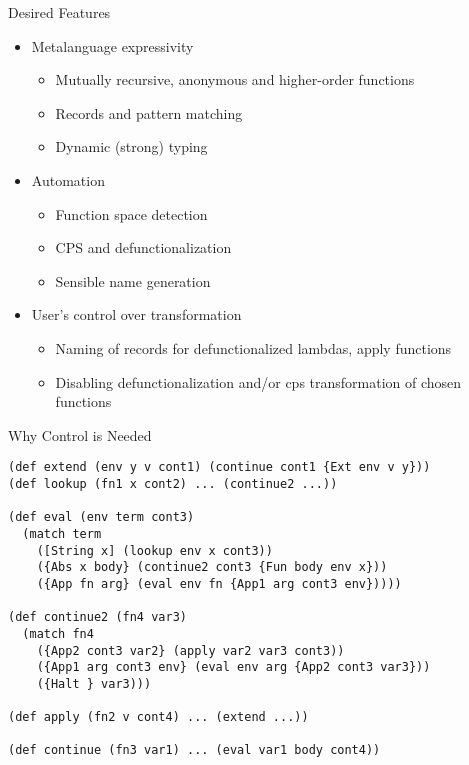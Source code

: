 \documentclass{beamer}
\begin{document}
\begin{frame}{Desired Features}
  \begin{itemize}
    \item Metalanguage expressivity
    \begin{itemize}
      \item Mutually recursive, anonymous and higher-order functions
      \item Records and pattern matching
      \item Dynamic (strong) typing
    \end{itemize}\pause
    \item Automation
    \begin{itemize}
      \item Function space detection
      \item CPS and defunctionalization
      \item Sensible name generation
    \end{itemize}\pause
    \item User's control over transformation
    \begin{itemize}
      \item Naming of records for defunctionalized lambdas, apply functions
      \item Disabling defunctionalization and/or cps transformation of chosen functions
    \end{itemize}
  \end{itemize}
\end{frame}

\begin{frame}[fragile]{Why Control is Needed}
  \begin{lstlisting}
(def extend (env y v cont1) (continue cont1 {Ext env v y}))
(def lookup (fn1 x cont2) ... (continue2 ...))

(def eval (env term cont3)
  (match term
    ([String x] (lookup env x cont3))
    ({Abs x body} (continue2 cont3 {Fun body env x}))
    ({App fn arg} (eval env fn {App1 arg cont3 env}))))

(def continue2 (fn4 var3)
  (match fn4
    ({App2 cont3 var2} (apply var2 var3 cont3))
    ({App1 arg cont3 env} (eval env arg {App2 cont3 var3}))
    ({Halt } var3)))

(def apply (fn2 v cont4) ... (extend ...))

(def continue (fn3 var1) ... (eval var1 body cont4))
  \end{lstlisting}
\end{frame}
\end{document}
